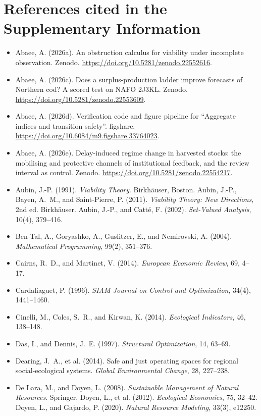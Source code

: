 \section*{References cited in the Supplementary Information}
\begin{itemize}[leftmargin=1.5em,itemsep=1pt]
\item Abaee, A. (2026a). An obstruction calculus for viability under incomplete observation. Zenodo. \url{https://doi.org/10.5281/zenodo.22552616}.
\item Abaee, A. (2026c). Does a surplus-production ladder improve forecasts of Northern cod? A scored test on NAFO 2J3KL. Zenodo. \url{https://doi.org/10.5281/zenodo.22553609}.
\item Abaee, A. (2026d). Verification code and figure pipeline for ``Aggregate indices and transition safety''. figshare. \url{https://doi.org/10.6084/m9.figshare.33764023}.
\item Abaee, A. (2026e). Delay-induced regime change in harvested stocks: the mobilising and protective channels of institutional feedback, and the review interval as control. Zenodo. \url{https://doi.org/10.5281/zenodo.22554217}.
\item Aubin, J.-P. (1991). \emph{Viability Theory}. Birkh\"auser, Boston. Aubin, J.-P., Bayen, A.~M., and Saint-Pierre, P. (2011). \emph{Viability Theory: New Directions}, 2nd ed. Birkh\"auser. Aubin, J.-P., and Catt\'e, F. (2002). \emph{Set-Valued Analysis}, 10(4), 379--416.
\item Ben-Tal, A., Goryashko, A., Guslitzer, E., and Nemirovski, A. (2004). \emph{Mathematical Programming}, 99(2), 351--376.
\item Cairns, R.~D., and Martinet, V. (2014). \emph{European Economic Review}, 69, 4--17.
\item Cardaliaguet, P. (1996). \emph{SIAM Journal on Control and Optimization}, 34(4), 1441--1460.
\item Cinelli, M., Coles, S.~R., and Kirwan, K. (2014). \emph{Ecological Indicators}, 46, 138--148.
\item Das, I., and Dennis, J.~E. (1997). \emph{Structural Optimization}, 14, 63--69.
\item Dearing, J.~A., et al. (2014). Safe and just operating spaces for regional social-ecological systems. \emph{Global Environmental Change}, 28, 227--238.
\item De Lara, M., and Doyen, L. (2008). \emph{Sustainable Management of Natural Resources}. Springer. Doyen, L., et al. (2012). \emph{Ecological Economics}, 75, 32--42. Doyen, L., and Gajardo, P. (2020). \emph{Natural Resource Modeling}, 33(3), e12250.

\end{itemize}

